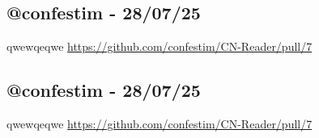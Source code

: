 
\subsection*{@confestim - 28/07/25}
qwewqeqwe
\url{https://github.com/confestim/CN-Reader/pull/7}

\subsection*{@confestim - 28/07/25}
qwewqeqwe
\url{https://github.com/confestim/CN-Reader/pull/7}
